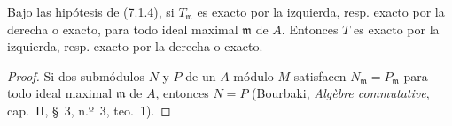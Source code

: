 \begin{proposition}[7.1.5]
Bajo las hipótesis de (7.1.4), si $T_{\mathfrak m}$ es exacto por la izquierda, resp.
exacto por la derecha o exacto, para todo ideal maximal
$\mathfrak m$ de $A$. Entonces $T$ es exacto por la izquierda,
resp. exacto por la derecha o exacto.
\end{proposition}

\begin{proof}
Si dos submódulos $N$ y $P$ de un $A$-módulo $M$ satisfacen
$N_{\mathfrak m}=P_{\mathfrak m}$
para todo ideal maximal $\mathfrak m$ de $A$, entonces $N=P$
(Bourbaki, \emph{Algèbre commutative}, cap.~II, \S~3,
n.º~3, teo.~1).
\end{proof}
